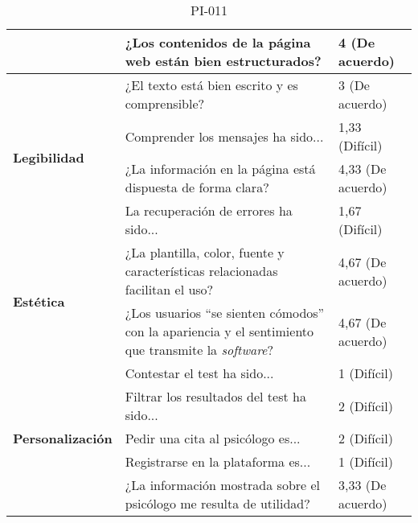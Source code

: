 \begin{table}[htpb]
\begin{tabularx}{\textwidth}{|l|X|l|}
                                          & ¿Los contenidos de la página web están bien estructurados?                                                          & 4 (De acuerdo)      \\ \hline
\multirow{4}{*}{\textbf{Legibilidad}}     & ¿El texto está bien escrito y es comprensible?                                                                      & 3 (De acuerdo)      \\ \cline{2-3} 
                                          & Comprender los mensajes ha sido...                                                                                  & 1,33 (Difícil)      \\ \cline{2-3} 
                                          & ¿La información en la página está dispuesta de forma clara?                                                         & 4,33 (De acuerdo)   \\ \cline{2-3} 
                                          & La recuperación de errores ha sido...                                                                               & 1,67 (Difícil)      \\ \hline
\multirow{2}{*}{\textbf{Estética}}        & ¿La plantilla, color, fuente y características relacionadas facilitan el uso?                                       & 4,67 (De acuerdo)   \\ \cline{2-3} 
                                          & ¿Los usuarios “se sienten cómodos” con la apariencia y el sentimiento que transmite la \textit{software}?                      & 4,67 (De acuerdo)   \\ \hline
\multirow{5}{*}{\textbf{Personalización}} & Contestar el test ha sido...                                                                                        & 1 (Difícil)         \\ \cline{2-3} 
                                          & Filtrar los resultados del test ha sido...                                                                          & 2 (Difícil)         \\ \cline{2-3} 
                                          & Pedir una cita al psicólogo es...                                                                                   & 2 (Difícil)         \\ \cline{2-3} 
                                          & Registrarse en la plataforma es...                                                                                  & 1 (Difícil)         \\ \cline{2-3} 
                                          & ¿La información mostrada sobre el psicólogo me resulta de utilidad?                                                 & 3,33 (De acuerdo)   \\ \hline
\end{tabularx}
\caption{PI-011}
\end{table}


